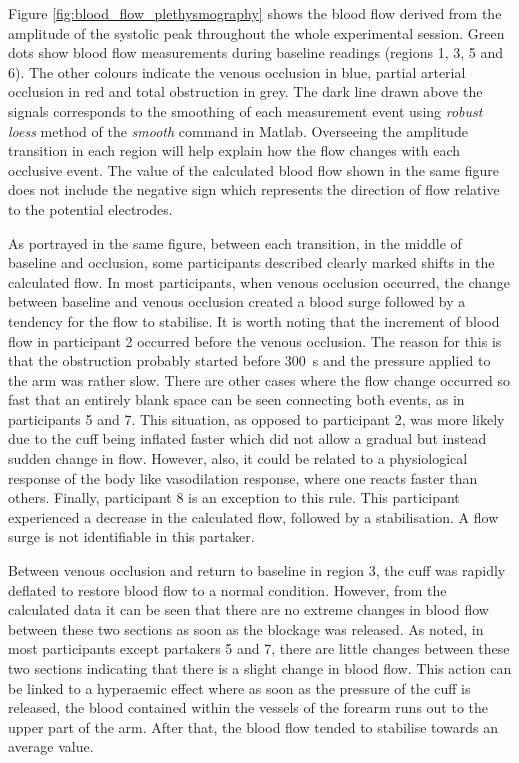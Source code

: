 Figure \ref{fig:blood_flow_plethysmography} shows the blood flow derived from the amplitude of the systolic peak throughout the whole experimental session. Green dots show blood flow measurements during baseline readings (regions 1, 3, 5 and 6). The other colours indicate the venous occlusion in blue, partial arterial occlusion in red and total obstruction in grey. The dark line drawn above the signals corresponds to the smoothing of each measurement event using \textit{robust loess} method of the \textit{smooth} command in Matlab. Overseeing the amplitude transition in each region will help explain how the flow changes with each occlusive event. The value of the calculated blood flow shown in the same figure does not include the negative sign which represents the direction of flow relative to the potential electrodes.

As portrayed in the same figure, between each transition, in the middle of baseline and occlusion, some participants described clearly marked shifts in the calculated flow. In most participants, when venous occlusion occurred, the change between baseline and venous occlusion created a blood surge followed by a tendency for the flow to stabilise. It is worth noting that the increment of blood flow in participant 2 occurred before the venous occlusion. The reason for this is that the obstruction probably started before \SI{300}{\second} and the pressure applied to the arm was rather slow. There are other cases where the flow change occurred so fast that an entirely blank space can be seen connecting both events, as in participants 5 and 7. This situation, as opposed to participant 2, was more likely due to the cuff being inflated faster which did not allow a gradual but instead sudden change in flow. However, also, it could be related to a physiological response of the body like vasodilation response, where one reacts faster than others. Finally, participant 8 is an exception to this rule. This participant experienced a decrease in the calculated flow, followed by a stabilisation. A flow surge is not identifiable in this partaker.

Between venous occlusion and return to baseline in region 3, the cuff was rapidly deflated to restore blood flow to a normal condition. However, from the calculated data it can be seen that there are no extreme changes in blood flow between these two sections as soon as the blockage was released. As noted, in most participants except partakers 5 and 7, there are little changes between these two sections indicating that there is a slight change in blood flow. This action can be linked to a hyperaemic effect where as soon as the pressure of the cuff is released, the blood contained within the vessels of the forearm runs out to the upper part of the arm. After that, the blood flow tended to stabilise towards an average value.

